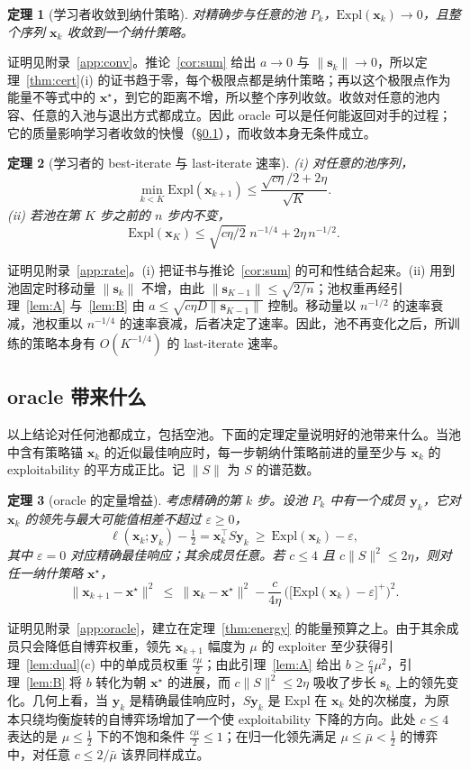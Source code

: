 \documentclass{article}
\theoremstyle{plain}
\newtheorem{theorem}{定理}[section]
\theoremstyle{remark}
\newcommand{\Expl}{\mathrm{Expl}}
\newcommand{\bx}{{\bm{x}}}
\newcommand{\by}{{\bm{y}}}
\newcommand{\xs}{\bx^{\star}}
\newcommand{\dx}{{\bm{s}}}
\begin{document}
\begin{theorem}[学习者收敛到纳什策略]
\label{thm:conv}
对精确步与任意的池 $P_k$，$\Expl(\bx_k)\to0$，且整个序列 $\bx_k$ 收敛到一个纳什策略。
\end{theorem}
证明见附录~\ref{app:conv}。推论~\ref{cor:sum} 给出 $a\to0$ 与 $\|\dx_k\|\to0$，所以定理~\ref{thm:cert}(i) 的证书趋于零，每个极限点都是纳什策略；再以这个极限点作为能量不等式中的 $\xs$，到它的距离不增，所以整个序列收敛。收敛对任意的池内容、任意的入池与退出方式都成立。因此 oracle 可以是任何能返回对手的过程；它的质量影响学习者收敛的快慢（\S\ref{sec:oracle-rate}），而收敛本身无条件成立。

\begin{theorem}[学习者的 best-iterate 与 last-iterate 速率]
\label{thm:rate}
(i) 对任意的池序列，
\[
\min_{k<K}\Expl(\bx_{k+1})\le\frac{\sqrt{c\eta}/2+2\eta}{\sqrt K} .
\]
(ii) 若池在第 $K$ 步之前的 $n$ 步内不变，
\[
\Expl(\bx_K)\le\sqrt{c\eta/2}\;n^{-1/4}+2\eta\,n^{-1/2} .
\]
\end{theorem}
证明见附录~\ref{app:rate}。(i) 把证书与推论~\ref{cor:sum} 的可和性结合起来。(ii) 用到池固定时移动量 $\|\dx_k\|$ 不增，由此 $\|\dx_{K-1}\|\le\sqrt{2/n}$；池权重再经引理~\ref{lem:A} 与~\ref{lem:B} 由 $a\le\sqrt{c\eta D\|\dx_{K-1}\|}$ 控制。移动量以 $n^{-1/2}$ 的速率衰减，池权重以 $n^{-1/4}$ 的速率衰减，后者决定了速率。因此，池不再变化之后，所训练的策略本身有 $O(K^{-1/4})$ 的 last-iterate 速率。

\subsection{oracle 带来什么}
\label{sec:oracle-rate}

以上结论对任何池都成立，包括空池。下面的定理定量说明好的池带来什么。当池中含有策略锚 $\bx_k$ 的近似最佳响应时，每一步朝纳什策略前进的量至少与 $\bx_k$ 的 exploitability 的平方成正比。记 $\|S\|$ 为 $S$ 的谱范数。

\begin{theorem}[oracle 的定量增益]
\label{thm:oracle}
考虑精确的第 $k$ 步。设池 $P_k$ 中有一个成员 $\by_k$，它对 $\bx_k$ 的领先与最大可能值相差不超过 $\varepsilon\ge0$，
\[
\ell(\bx_k;\by_k)-\tfrac12=\bx_k^\top S\by_k\ \ge\ \Expl(\bx_k)-\varepsilon ,
\]
其中 $\varepsilon=0$ 对应精确最佳响应；其余成员任意。若 $c\le4$ 且 $c\|S\|^2\le2\eta$，则对任一纳什策略 $\xs$，
\[
\|\bx_{k+1}-\xs\|^2\ \le\ \|\bx_k-\xs\|^2-\frac{c}{4\eta}\,\Big(\big[\Expl(\bx_k)-\varepsilon\big]^+\Big)^2 .
\]
\end{theorem}
证明见附录~\ref{app:oracle}，建立在定理~\ref{thm:energy} 的能量预算之上。由于其余成员只会降低自博弈权重，领先 $\bx_{k+1}$ 幅度为 $\mu$ 的 exploiter 至少获得引理~\ref{lem:dual}(c) 中的单成员权重 $\tfrac{c\mu}2$；由此引理~\ref{lem:A} 给出 $b\ge\tfrac c4\mu^2$，引理~\ref{lem:B} 将 $b$ 转化为朝 $\xs$ 的进展，而 $c\|S\|^2\le2\eta$ 吸收了步长 $\dx_k$ 上的领先变化。几何上看，当 $\by_k$ 是精确最佳响应时，$S\by_k$ 是 $\Expl$ 在 $\bx_k$ 处的次梯度，为原本只绕均衡旋转的自博弈场增加了一个使 exploitability 下降的方向。此处 $c\le4$ 表达的是 $\mu\le\tfrac12$ 下的不饱和条件 $\tfrac{c\mu}2\le1$；在归一化领先满足 $\mu\le\bar\mu<\tfrac12$ 的博弈中，对任意 $c\le2/\bar\mu$ 该界同样成立。
\end{document}
